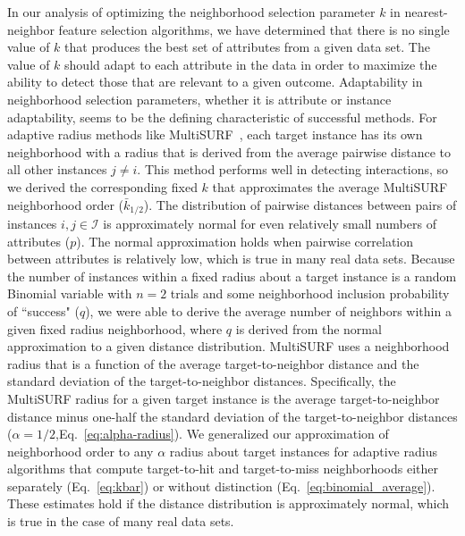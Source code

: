 \documentclass[10pt,letterpaper]{article}
\begin{document}
In our analysis of optimizing the neighborhood selection parameter $k$ in nearest-neighbor feature selection algorithms, we have determined that there is no single value of $k$ that produces the best set of attributes from a given data set. The value of $k$ should adapt to each attribute in the data in order to maximize the ability to detect those that are relevant to a given outcome. Adaptability in neighborhood selection parameters, whether it is attribute or instance adaptability, seems to be the defining characteristic of successful methods. For adaptive radius methods like MultiSURF~\cite{urbanowicz17}, each target instance has its own neighborhood with a radius that is derived from the average pairwise distance to all other instances $j \neq i$. This method performs well in detecting interactions, so we derived the corresponding fixed $k$ that approximates the average MultiSURF neighborhood order ($\bar{k}_{1/2}$). The distribution of pairwise distances between pairs of instances $i,j \in \mathcal{I}$ is approximately normal for even relatively small numbers of attributes ($p$). The normal approximation holds when pairwise correlation between attributes is relatively low, which is true in many real data sets. Because the number of instances within a fixed radius about a target instance is a random Binomial variable with $n=2$ trials and some neighborhood inclusion probability of ``success" ($q$), we were able to derive the average number of neighbors within a given fixed radius neighborhood, where $q$ is derived from the normal approximation to a given distance distribution. MultiSURF uses a neighborhood radius that is a function of the average target-to-neighbor distance and the standard deviation of the target-to-neighbor distances. Specifically, the MultiSURF radius for a given target instance is the average target-to-neighbor distance minus one-half the standard deviation of the target-to-neighbor distances ($\alpha=1/2$,Eq.~\ref{eq:alpha-radius}). We generalized our approximation of neighborhood order to any $\alpha$ radius about target instances for adaptive radius algorithms that compute target-to-hit and target-to-miss neighborhoods either separately (Eq.~\ref{eq:kbar}) or without distinction (Eq.~\ref{eq:binomial_average}). These estimates hold if the distance distribution is approximately normal, which is true in the case of many real data sets. 
\end{document}
